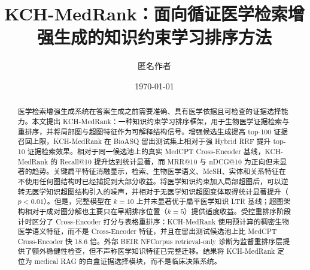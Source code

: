 \documentclass[UTF8,11pt]{ctexart}
\title{KCH-MedRank：面向循证医学检索增强生成的知识约束学习排序方法}
\author{匿名作者}
\date{\today}
\begin{document}
\maketitle

\begin{abstract}
医学检索增强生成系统在答案生成之前需要准确、具有医学依据且可检查的证据选择能力。本文提出 KCH-MedRank：一种知识约束学习排序框架，用于生物医学证据检索与重排序，并将局部图与超图特征作为可解释结构信号。增强候选生成提高 top-100 证据召回上限，KCH-MedRank 在 BioASQ 留出测试集上相对于强 Hybrid RRF 提升 top-10 证据检索效果。相对于同一候选池上的真实 MedCPT Cross-Encoder 基线，KCH-MedRank 的 Recall@10 提升达到统计显著，而 MRR@10 与 nDCG@10 为正向但未显著的趋势。关键扁平特征消融显示，检索、生物医学语义、MeSH、实体和关系特征在不使用任何图结构时已经捕捉到大部分收益。将医学知识约束加入局部超图后，可以逆转无医学知识超图结构引入的噪声，并相对于无医学知识超图变体取得统计显著提升（$p < 0.01$）。但是，完整模型在 $k{=}10$ 上并未显著优于扁平医学知识 LTR 基线；超图架构相对于成对图分解也主要只在早期排序位置（$k{=}5$）提供适度收益。受控重排序阶段计时区分了 Cross-Encoder 打分与表格重排序：KCH-MedRank 使用预计算的稠密生物医学语义特征，而不是 Cross-Encoder 特征，并且在留出测试候选池上比 MedCPT Cross-Encoder 快 18.6 倍。外部 BEIR NFCorpus retrieval-only 诊断为监督重排序层提供了额外稳健性检查，但不声称医学知识特征已完整迁移。结果将 KCH-MedRank 定位为 medical RAG 的白盒证据选择模块，而不是临床决策系统。
\end{abstract}











\appendix




\end{document}
